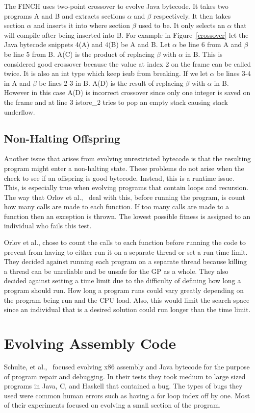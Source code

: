 \documentclass{sig-alternate}
\begin{document}
The FINCH uses two-point crossover to evolve Java bytecode. It takes two programs A and B and extracts sections $\alpha$ and $\beta$ respectively. It then takes section $\alpha$ and inserts it into where section $\beta$ used to be. It only selects an $\alpha$ that will compile after being inserted into B.
For example in Figure~\ref{crossover} let the Java bytecode snippets 4(A) and 4(B) be A and B. Let $\alpha$ be line 6 from A and $\beta$ be line 5 from B. A(C) is the product of replacing $\beta$ with $\alpha$ in B. This is considered good crossover because the value at index 2 on the frame can be called twice. It is also an int type which keep isub from breaking. If we let $\alpha$ be lines 3-4 in A and $\beta$ be lines 2-3 in B. A(D) is the result of replacing $\beta$ with $\alpha$ in B. However in this case A(D) is incorrect crossover since only one integer is saved on the frame and at line 3 istore\_2 tries to pop an empty stack causing stack underflow. 

\subsection{Non-Halting Offspring}
Another issue that arises from evolving unrestricted bytecode is that the resulting program might enter a non-halting state. These problems do not arise when the check to see if an offspring is good bytecode. Instead, this is a runtime issue. This, is especially true when evolving programs that contain loops and recursion.
The way that Orlov et al.,~\cite{FINCH:2011} deal with this, before running the program, is count how many calls are made to each function. If too many calls are made to a function then an exception is thrown. The lowest possible fitness is assigned to an individual who fails this test.

Orlov et al., chose to count the calls to each function before running the code to prevent from having to either run it on a separate thread or set a run time limit. They decided against running each program on a separate thread because killing a thread can be unreliable and be unsafe for the GP as a whole. They also decided against setting a time limit due to the difficulty of defining how long a program should run. How long a program runs could vary greatly depending on the program being run and the CPU load. Also, this would limit the search space since an individual that is a desired solution could run longer than the time limit.


\section{Evolving Assembly Code}
Schulte, et al.,~\cite{Assembly:2010} focused evolving x86 assembly and Java bytecode for the purpose of program repair and debugging. In their tests they took medium to large sized programs in Java, C, and Haskell that contained a bug. The types of bugs they used were common human errors such as having a for loop index off by one. Most of their experiments focused on evolving a small section of the program. 
\end{document}
